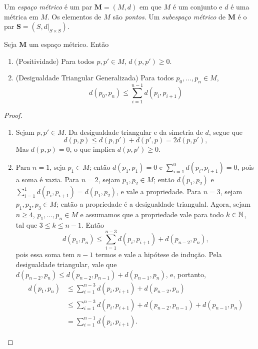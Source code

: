 \begin{defi}
Um \emph{espaço métrico} é um par $\bm M = (M,d)$ em que $M$ é um conjunto e $d$ é uma métrica em $M$. Os elementos de $M$ são \emph{pontos}. Um \emph{subespaço métrico} de $\bm M$ é o par $\bm S=(S,d|_{S \times S})$.
\end{defi}

\begin{prop}
Seja $\bm M$ um espaço métrico. Então
	\begin{enumerate}
	\item (Positividade) Para todos $p,p' \in M$, $d(p,p') \geq 0$.
	\item (Desigualdade Triangular Generalizada) Para todos $p_0,\ldots,p_n \in M$,
		\begin{equation*}
		d(p_0,p_n) \leq \sum_{i=1}^{n-1} d(p_i,p_{i+1})
		\end{equation*}
	\end{enumerate}
\end{prop}
\begin{proof}
	\begin{enumerate}
	\item Sejam $p,p' \in M$. Da desigualdade triangular e da simetria de $d$, segue que
	\begin{equation*}
	d(p,p) \leq d (p,p')+d(p',p)= 2 d(p,p'),
	\end{equation*}
Mas $d(p,p) = 0$, o que implica $d(p,p') \geq 0$.
	\item Para $n=1$, seja $p_1 \in M$; então $d(p_1,p_1)=0$ e $\sum_{i=1}^{0} d(p_i,p_{i+1})=0$, pois a soma é vazia. Para $n=2$, sejam $p_1,p_2 \in M$; então $d(p_1,p_2)$ e $\sum_{i=1}^{1} d(p_i,p_{i+1})=d(p_1,p_2)$, e vale a propriedade. Para $n=3$, sejam $p_1,p_2,p_3 \in M$; então a propriedade é a desigualdade triangulal. Agora, sejam $n \geq 4$, $p_1,\ldots,p_n \in M$ e assumamos que a propriedade vale para todo $k \in \mathbb{N}$, tal que $3 \leq k \leq n-1$. Então
	\begin{equation*}
	d(p_1,p_n) \leq \sum_{i=1}^{n-3} d(p_i,p_{i+1})+d(p_{n-2},p_n),
	\end{equation*}
pois essa soma tem $n-1$ termos e vale a hipótese de indução. Pela desigualdade triangular, vale que $d(p_{n-2},p_n) \leq d(p_{n-2},p_{n-1})+d(p_{n-1},p_n)$, e, portanto,
	\begin{align*}
	d(p_1,p_n) &\leq \sum_{i=1}^{n-3} d(p_i,p_{i+1})+d(p_{n-2},p_n) \\
			&\leq \sum_{i=1}^{n-3} d(p_i,p_{i+1}) + d(p_{n-2},p_{n-1})+d(p_{n-1},p_n) \\
			&= \sum_{i=1}^{n-1} d(p_i,p_{i+1}).
	\end{align*}
	\end{enumerate}
\end{proof}

